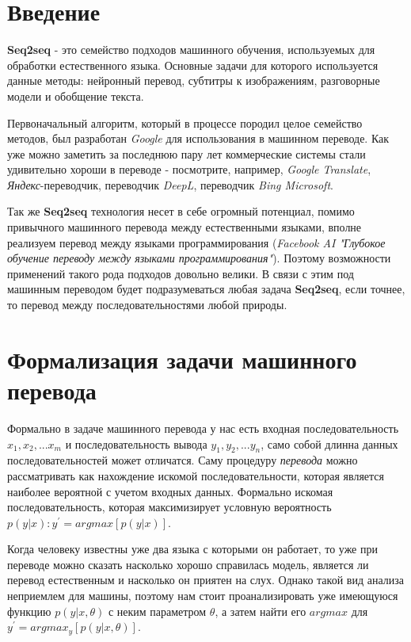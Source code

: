 \documentclass[a4paper,russian]{article}
\begin{document}
	
	
	
	\section{Введение}
	
	\textbf{Seq2seq} - это семейство подходов машинного обучения, используемых для обработки естественного языка. Основные задачи для которого используется данные методы: нейронный перевод, субтитры к изображениям, разговорные модели и обобщение текста.
	
	Первоначальный алгоритм, который в процессе породил целое семейство методов, был разработан \textit{Google} для использования в машинном переводе. Как уже можно заметить за последнюю пару лет коммерческие системы стали удивительно хороши в  переводе - посмотрите, например, \textit{Google Translate}, \textit{Яндекс}-переводчик, переводчик \textit{DeepL}, переводчик \textit{Bing Microsoft}.
	
	Так же \textbf{Seq2seq} технология несет в себе огромный потенциал, помимо привычного машинного перевода между естественными языками, вполне реализуем перевод между языками программирования (\textit{Facebook AI "Глубокое обучение переводу между языками программирования"}). Поэтому возможности применений такого рода подходов довольно велики. В связи с этим под машинным переводом будет подразумеваться любая задача \textbf{Seq2seq}, если точнее, то перевод между последовательностями любой природы.
	
	\clearpage
	
	\section{Формализация задачи машинного перевода}
	
	Формально в задаче машинного перевода у нас есть входная последовательность $x_{1}, x_{2}, ... x_{m}$ и последовательность вывода $y_{1}, y_{2}, ... y_{n}$, само собой длинна данных последовательностей может отличатся. Саму процедуру \textit{перевода} можно рассматривать как нахождение искомой последовательности, которая является наиболее вероятной с учетом входных данных. Формально искомая последовательность, которая максимизирует условную вероятность $p(y|x): y^{'} = argmax[p(y|x)]$.
	
	Когда человеку известны уже два языка с которыми он работает, то уже при переводе можно сказать насколько хорошо справилась модель, является ли перевод естественным и насколько он приятен на слух. Однако такой вид анализа неприемлем для машины, поэтому нам стоит проанализировать уже имеющуюся функцию $p(y|x,\theta)$ с неким параметром $\theta$, а затем найти его $argmax$ для $y^{'} = argmax_{y}[p(y|x, \theta)]$.
	
\end{document}
